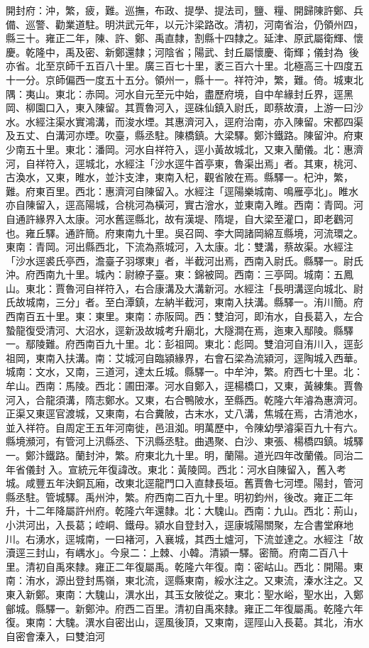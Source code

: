 \begin{pinyinscope}
開封府：沖，繁，疲，難。巡撫，布政、提學、提法司，鹽、糧、開歸陳許鄭、兵備、巡警、勸業道駐。明洪武元年，以元汴梁路改。清初，河南省治，仍領州四，縣三十。雍正二年，陳、許、鄭、禹直隸，割縣十四隸之。延津、原武屬衛輝、懷慶。乾隆中，禹及密、新鄭還隸；河陰省；陽武、封丘屬懷慶、衛輝；儀封為，後亦省。北至京師千五百八十里。廣三百七十里，袤三百六十里。北極高三十四度五十一分。京師偏西一度五十五分。領州一，縣十一。祥符沖，繁，難。倚。城東北隅：夷山。東北：赤岡。河水自元至元中始，盡歷府境，自中牟緣封丘界，逕黑岡、柳園口入，東入陳留。其賈魯河入，逕硃仙鎮入尉氏，即蔡故瀆，上游一曰沙水。水經注渠水實鴻溝，而浚水堙。其惠濟河入，逕府治南，亦入陳留。宋都四渠及五丈、白溝河亦堙。吹臺，縣丞駐。陳橋鎮。大梁驛。鄭汴鐵路。陳留沖。府東少南五十里。東北：潘岡。河水自祥符入，逕小黃故城北，又東入蘭儀。北：惠濟河，自祥符入，逕城北，水經注「沙水逕牛首亭東，魯渠出焉」者。其東，桃河、古渙水，又東，睢水，並汴支津，東南入杞，觀省陂在焉。縣驛一。杞沖，繁，難。府東百里。西北：惠濟河自陳留入。水經注「逕陽樂城南、鳴雁亭北」。睢水亦自陳留入，逕高陽城，合桃河為橫河，實古澮水，並東南入睢。西南：青岡。河自通許緣界入太康。河水舊逕縣北，故有漢堤、隋堤，自大梁至灌口，即老鸛河也。雍丘驛。通許簡。府東南九十里。吳召岡、李大岡諸岡綿亙縣境，河流環之。東南：青岡。河出縣西北，下流為燕城河，入太康。北：雙溝，蔡故渠。水經注「沙水逕裘氏亭西，澹臺子羽塚東」者，半截河出焉，西南入尉氏。縣驛一。尉氏沖。府西南九十里。城內：尉繚子臺。東：錦被岡。西南：三亭岡。城南：五鳳山。東北：賈魯河自祥符入，右合康溝及大溝新河。水經注「長明溝逕向城北、尉氏故城南，三分」者。至白潭鎮，左納半截河，東南入扶溝。縣驛一。洧川簡。府西南百五十里。東：東里。東南：赤阪岡。西：雙洎河，即洧水，自長葛入，左合蟄龍復受清河、大沼水，逕新汲故城考升廟北，大隧澗在焉，迤東入鄢陵。縣驛一。鄢陵難。府西南百九十里。北：彭祖岡。東北：彪岡。雙洎河自洧川入，逕彭祖岡，東南入扶溝。南：艾城河自臨潁緣界，右會石梁為流潁河，逕陶城入西華。城南：文水，又南，三道河，達太丘城。縣驛一。中牟沖，繁。府西七十里。北：牟山。西南：馬陵。西北：圃田澤。河水自鄭入，逕楊橋口，又東，黃練集。賈魯河入，合龍須溝，隋志鄭水。又東，右合鴨陂水，至縣西。乾隆六年濬為惠濟河。正渠又東逕官渡城，又東南，右合糞陂，古末水，丈八溝，焦城在焉，古清池水，並入祥符。自周定王五年河南徙，邑沮洳。明萬歷中，令陳幼學濬渠百九十有六。縣境瀕河，有管河上汛縣丞、下汛縣丞駐。曲遇聚、白沙、東張、楊橋四鎮。城驛一。鄭汴鐵路。蘭封沖，繁。府東北九十里。明，蘭陽。道光四年改蘭儀。同治二年省儀封入。宣統元年復諱改。東北：黃陵岡。西北：河水自陳留入，舊入考城。咸豐五年決銅瓦廂，改東北逕龍門口入直隸長垣。舊賈魯七河堙。陽封，管河縣丞駐。管城驛。禹州沖，繁。府西南二百九十里。明初鈞州，後改。雍正二年升，十二年降屬許州府。乾隆六年還隸。北：大騩山。西南：九山。西北：荊山，小洪河出，入長葛；崆峒、鐵母。潁水自登封入，逕康城陽關聚，左合書堂麻地川。右湧水，逕城南，一曰褚河，入襄城，其西土爐河，下流並達之。水經注「故瀆逕三封山，有嵎水」。今泉二：上棘、小韓。清潁一驛。密簡。府南二百八十里。清初自禹來隸。雍正二年復屬禹。乾隆六年復。南：密岵山。西北：開陽。東南：洧水，源出登封馬嶺，東北流，逕縣東南，綏水注之。又東流，溱水注之。又東入新鄭。東南：大騩山，潩水出，其玉女陂從之。東北：聖水峪，聖水出，入鄭鄶城。縣驛一。新鄭沖。府西二百里。清初自禹來隸。雍正二年復屬禹。乾隆六年復。東南：大騩。潩水自密出山，逕風後頂，又東南，逕陘山入長葛。其北，洧水自密會溱入，曰雙洎河
\end{pinyinscope}
